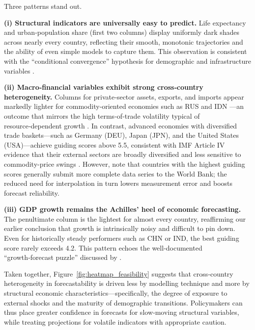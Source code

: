 \documentclass[12pt]{article}
\begin{document}
Three patterns stand out. 

\textbf{(i) Structural indicators are universally easy to predict.} Life expectancy and urban‑population share (first two columns) display uniformly dark shades across nearly every country, reflecting their smooth, monotonic trajectories and the ability of even simple models to capture them. This observation is consistent with the “conditional convergence” hypothesis for demographic and infrastructure variables \cite{Barro1992Convergence}.

\textbf{(ii) Macro‑financial variables exhibit strong cross‑country heterogeneity.} Columns for private‑sector assets, exports, and imports appear markedly lighter for commodity‑oriented economies such as RUS \cite{Prebisch1950, SachsWarner2001} and IDN \cite{VanDerPloegPoelhekke2009} —an outcome that mirrors the high terms‑of‑trade volatility typical of resource‑dependent growth \cite{Prebisch1950}. 
In contrast, advanced economies with diversified trade baskets—such as Germany (DEU), Japan (JPN), and the United States (USA)—achieve guiding scores above 5.5, consistent with IMF Article IV evidence that their external sectors are broadly diversified and less sensitive to commodity-price swings \cite{IMF2023Germany, IMF2023Japan, IMF2023USA}.
However, note that countries with the highest guiding scores generally submit more complete data series to the World Bank; the reduced need for interpolation in turn lowers measurement error and boosts forecast reliability.

\textbf{(iii) GDP growth remains the Achilles’ heel of economic forecasting.} The penultimate column is the lightest for almost every country, reaffirming our earlier conclusion that growth is intrinsically noisy and difficult to pin down. Even for historically steady performers such as CHN or IND, the best guiding score rarely exceeds 4.2. This pattern echoes the well‑documented “growth‑forecast puzzle” discussed by \cite{Loungani2001}.

Taken together, Figure~\ref{fig:heatmap_feasibility} suggests 
that cross‑country heterogeneity in forecastability is driven
 less by modelling technique and more by structural economic 
 characteristics—specifically, the degree of exposure to external 
 shocks and the maturity of demographic transitions. Policymakers 
 can thus place greater confidence in forecasts for slow‑moving 
 structural variables, while treating projections for volatile 
 indicators with appropriate caution.
\end{document}
